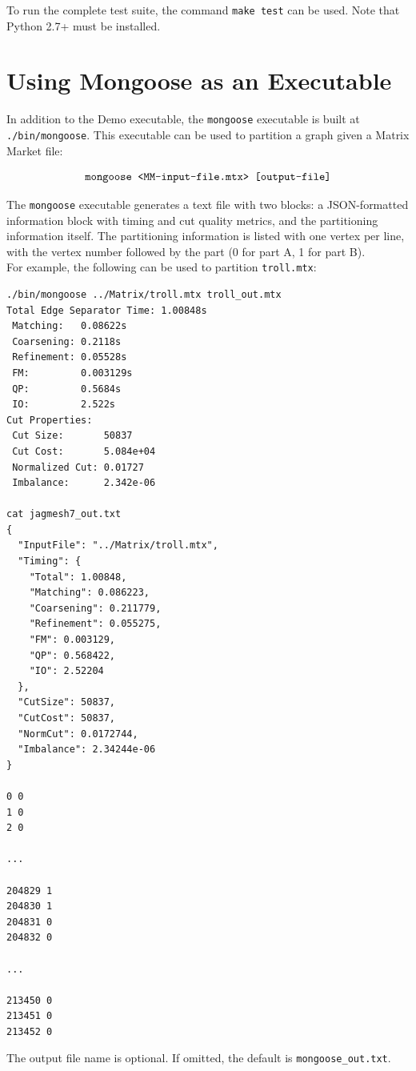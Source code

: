 \documentclass[letter]{article}
\begin{document}
To run the complete test suite, the command \texttt{make test} can be used. Note that Python 2.7+ must be installed.

\section{Using Mongoose as an Executable}

In addition to the Demo executable, the \texttt{mongoose} executable is built at \texttt{./bin/mongoose}. This executable can be used to partition a graph given a Matrix Market file:

\[\text{\texttt{mongoose <MM-input-file.mtx> [output-file]}}\]

The \texttt{mongoose} executable generates a text file with two blocks: a JSON-formatted information block with timing and cut quality metrics, and the partitioning information itself. The partitioning information is listed with one vertex per line, with the vertex number followed by the part (0 for part A, 1 for part B).\\

For example, the following can be used to partition \texttt{troll.mtx}:

\begin{lstlisting}[numbers=none,xleftmargin=.2\textwidth, xrightmargin=.2\textwidth,keywordstyle=\color{black}]
./bin/mongoose ../Matrix/troll.mtx troll_out.mtx
Total Edge Separator Time: 1.00848s
 Matching:   0.08622s
 Coarsening: 0.2118s
 Refinement: 0.05528s
 FM:         0.003129s
 QP:         0.5684s
 IO:         2.522s
Cut Properties:
 Cut Size:       50837
 Cut Cost:       5.084e+04
 Normalized Cut: 0.01727
 Imbalance:      2.342e-06

cat jagmesh7_out.txt 
{
  "InputFile": "../Matrix/troll.mtx",
  "Timing": {
    "Total": 1.00848,
    "Matching": 0.086223,
    "Coarsening": 0.211779,
    "Refinement": 0.055275,
    "FM": 0.003129,
    "QP": 0.568422,
    "IO": 2.52204
  },
  "CutSize": 50837,
  "CutCost": 50837,
  "NormCut": 0.0172744,
  "Imbalance": 2.34244e-06
}

0 0
1 0
2 0

...

204829 1
204830 1
204831 0
204832 0

...

213450 0
213451 0
213452 0
\end{lstlisting}

The output file name is optional. If omitted, the default is \texttt{mongoose\_out.txt}.
\end{document}
